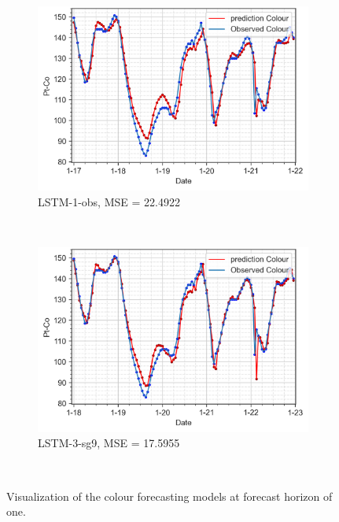 \begin{figure}[!ht]
  \centering
  \begin{subfigure}[t]{0.7\textwidth}
    \includegraphics[width=\linewidth]{imgs/results/steps/colour-lstm-1-fc1.png}
    \caption{LSTM-1-obs, MSE = 22.4922} \label{fig:colour-lstm-1-fc1}
  \end{subfigure}\\
  \vspace{1em}
  \begin{subfigure}[t]{0.7\textwidth}
    \includegraphics[width=\linewidth]{imgs/results/steps/colour-lstm-3-fc1.png}
    \caption{LSTM-3-sg9, MSE = 17.5955} \label{fig:colour-lstm-3-fc1}
  \end{subfigure}\\
\caption{Visualization of the colour forecasting models at forecast horizon of one.} \label{fig:colour-forecast-fc1}
\end{figure}

